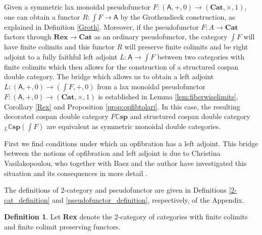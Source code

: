 \documentclass[oneside,final]{ucr}
\theoremstyle{definition}
\newtheorem{definition}[theorem]{Definition}
\newcommand{\A}{\mathsf{A}}
\newcommand{\define}[1]{{\bf \boldmath #1}}
\begin{document}
{Given a symmetric lax monoidal pseudofunctor $F \colon (\mathsf{A},+,0) \to (\mathbf{Cat},\times,1)$, one can obtain a functor $R \colon \int F \to \mathsf{A}$ by the Grothendieck construction, as explained in Definition \ref{Groth}. Moreover, if the pseudofunctor $F \colon A \to \mathbf{Cat}$ factors through $\mathbf{Rex} \to \mathbf{Cat}$ as an ordinary pseudofunctor, the category $\int F$ will have finite colimits and this functor $R$ will preserve finite colimits and be right adjoint to a fully faithful left adjoint $L \colon \mathsf{A} \to \int F$ between two categories with finite colimits which then allows for the construction of a structured cospan double category. The bridge which allows us to obtain a left adjoint $L \colon (\A,+,0) \to (\int F,+,0)$ from a lax monoidal pseudofunctor $F \colon (\A,+,0) \to (\mathbf{Cat},\times,1)$ is established in Lemma \ref{lem:fiberwiselimits}, Corollary \ref{Rex} and Proposition \ref{prop:opfibtolari}. In this case, the resulting decorated cospan double category $F \mathbb{C} \mathbf{sp}$ and structured cospan double category $_L \mathbb{C} \mathbf{sp}(\int{F})$ are equivalent as symmetric monoidal double categories.

First we find conditions under which an opfibration has a left adjoint. This bridge between the notions of opfibration and left adjoint is due to Christina Vasilakopoulou, who together with Baez and the author have investigated this situation and its consequences in more detail \cite{BCV}.

The definitions of 2-category and pseudofunctor are given in Definitions \ref{2-cat_definition} and \ref{pseudofunctor_definition}, respectively, of the Appendix.

\begin{definition}
Let \define{Rex} denote the 2-category of categories with finite colimits and finite colimit preserving functors.
\end{definition}

}
\end{document}
